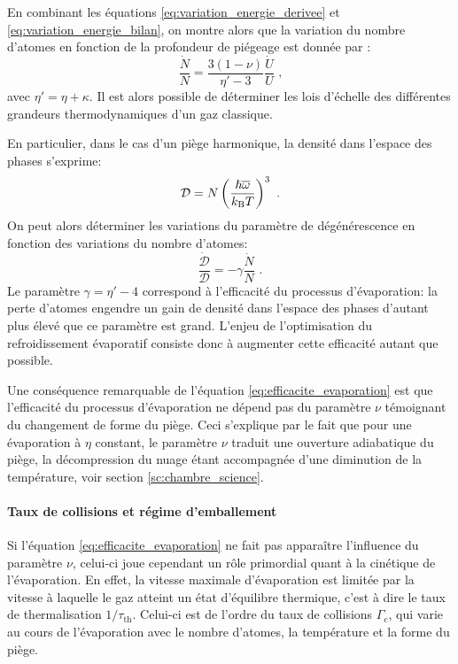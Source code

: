 En combinant les équations \ref{eq:variation_energie_derivee} et \ref{eq:variation_energie_bilan}, on montre alors que la variation du nombre d'atomes en fonction de la profondeur de piégeage est donnée par \citep{o2001scaling}:
\begin{equation}
\frac{\dot{N}}{N}={\frac{3(1-\nu)}{\eta'-3}} \frac{\dot{U}}{U} \text{ ,}
\label{eq:nombre_atome_evap}
\end{equation}
avec $\eta'=\eta+\kappa$. Il est alors possible de déterminer les lois d'échelle des différentes grandeurs thermodynamiques d'un gaz classique. 

En particulier, dans le cas d'un piège harmonique, la densité dans l'espace des phases s'exprime:
\begin{equation}
\mathcal{D}=N\left(\frac{\hslash \overline{\omega}}{k_{\mathrm{B}} T}\right)^3 \text{ .}
\end{equation}
On peut alors déterminer les variations du paramètre de dégénérescence en fonction des variations du nombre d'atomes: 
\begin{equation}
\frac{\dot{\mathcal{D}}}{\mathcal{D}} = -\gamma \frac{\dot{N}}{N} \text{ .}
\label{eq:efficacite_evaporation}
\end{equation}
Le paramètre $\gamma=\eta'-4$ correspond à l'efficacité du processus d'évaporation: la perte d'atomes engendre un gain de densité dans l'espace des phases d'autant plus élevé que ce paramètre est grand. L'enjeu de l'optimisation du refroidissement évaporatif consiste donc à augmenter cette efficacité autant que possible.

Une conséquence remarquable de l'équation \ref{eq:efficacite_evaporation} est que l'efficacité du processus d'évaporation ne dépend pas du paramètre $\nu$ témoignant du changement de forme du piège. Ceci s'explique par le fait que pour une évaporation à $\eta$ constant, le paramètre $\nu$ traduit une ouverture adiabatique du piège, la décompression du nuage étant accompagnée d'une diminution de la température, voir section \ref{sc:chambre_science}. 


\paragraph*{Taux de collisions et régime d'emballement}
Si l'équation \ref{eq:efficacite_evaporation} ne fait pas apparaître l'influence du paramètre $\nu$, celui-ci joue cependant un rôle primordial quant à la cinétique de l'évaporation. En effet, la vitesse maximale d'évaporation est limitée par la vitesse à laquelle le gaz atteint un état d'équilibre thermique, c'est à dire le taux de thermalisation $1/\tau_{\mathrm{th}}$. Celui-ci est de l'ordre du taux de collisions $\Gamma_{\mathrm{c}}$, qui varie au cours de l'évaporation avec le nombre d'atomes, la température et la forme du piège.%

